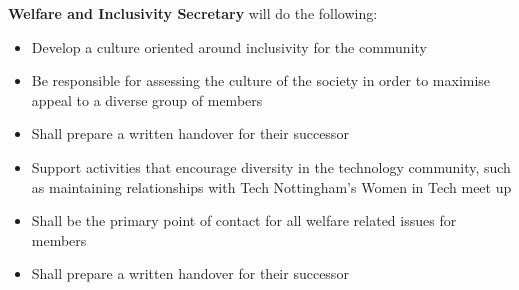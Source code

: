 \item \textbf{Welfare and Inclusivity Secretary} will do the following:
\begin{itemize} 
  \item Develop a culture oriented around inclusivity for the community
  \item Be responsible for assessing the culture of the society in order to maximise appeal to a diverse group of members
  \item Shall prepare a written handover for their successor
  \item Support activities that encourage diversity in the technology community, such as maintaining relationships with Tech Nottingham’s Women in Tech meet up
  \item Shall be the primary point of contact for all welfare related issues for members
  \item Shall prepare a written handover for their successor
\end{itemize}